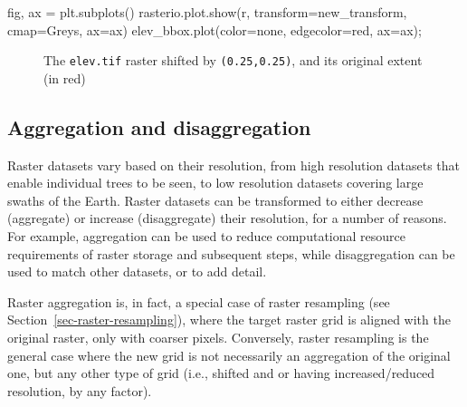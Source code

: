 \documentclass[
  letterpaper,
]{krantz}
\newenvironment{Shaded}{\begin{snugshade}}{\end{snugshade}}
\newcommand{\NormalTok}[1]{\textcolor[rgb]{0.00,0.23,0.31}{#1}}
\newcommand{\OperatorTok}[1]{\textcolor[rgb]{0.37,0.37,0.37}{#1}}
\newcommand{\StringTok}[1]{\textcolor[rgb]{0.13,0.47,0.30}{#1}}
\begin{document}
\begin{Shaded}
\begin{Highlighting}[]
\NormalTok{fig, ax }\OperatorTok{=}\NormalTok{ plt.subplots()}
\NormalTok{rasterio.plot.show(r, transform}\OperatorTok{=}\NormalTok{new\_transform, cmap}\OperatorTok{=}\StringTok{\textquotesingle{}Greys\textquotesingle{}}\NormalTok{, ax}\OperatorTok{=}\NormalTok{ax)}
\NormalTok{elev\_bbox.plot(color}\OperatorTok{=}\StringTok{\textquotesingle{}none\textquotesingle{}}\NormalTok{, edgecolor}\OperatorTok{=}\StringTok{\textquotesingle{}red\textquotesingle{}}\NormalTok{, ax}\OperatorTok{=}\NormalTok{ax)}\OperatorTok{;}
\end{Highlighting}
\end{Shaded}

\begin{figure}[H]


\caption{\label{fig-raster-shift-origin2}The \texttt{elev.tif} raster
shifted by \texttt{(0.25,0.25)}, and its original extent (in red)}

\end{figure}%

\subsection{Aggregation and disaggregation}\label{sec-raster-agg-disagg}

Raster datasets vary based on their resolution, from high resolution
datasets that enable individual trees to be seen, to low resolution
datasets covering large swaths of the Earth. Raster datasets can be
transformed to either decrease (aggregate) or increase (disaggregate)
their resolution, for a number of reasons. For example, aggregation can
be used to reduce computational resource requirements of raster storage
and subsequent steps, while disaggregation can be used to match other
datasets, or to add detail.

\begin{tcolorbox}[enhanced jigsaw, title=\textcolor{quarto-callout-note-color}{\faInfo}\hspace{0.5em}{Note}, arc=.35mm, toprule=.15mm, titlerule=0mm, colframe=quarto-callout-note-color-frame, breakable, toptitle=1mm, bottomtitle=1mm, rightrule=.15mm, colbacktitle=quarto-callout-note-color!10!white, leftrule=.75mm, left=2mm, bottomrule=.15mm, opacityback=0, coltitle=black, opacitybacktitle=0.6, colback=white]

Raster aggregation is, in fact, a special case of raster resampling (see
Section~\ref{sec-raster-resampling}), where the target raster grid is
aligned with the original raster, only with coarser pixels. Conversely,
raster resampling is the general case where the new grid is not
necessarily an aggregation of the original one, but any other type of
grid (i.e., shifted and or having increased/reduced resolution, by any
factor).

\end{tcolorbox}
\end{document}

